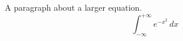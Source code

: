 \documentclass{article}
\begin{document}
	A paragraph about a larger equation.
	\begin{equation}
		\int_{-\infty}^{+\infty} e^{-x^{2}} \, dx
	\end{equation}
\end{document}
